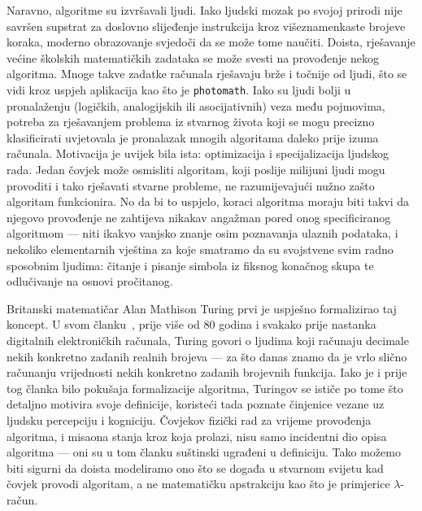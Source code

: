Naravno, algoritme su izvršavali ljudi. Iako ljudski mozak po svojoj prirodi nije savršen supstrat za doslovno slijeđenje instrukcija kroz višeznamenkaste brojeve koraka, moderno obrazovanje svjedoči da se može tome na\-u\-či\-ti. Doista, rješavanje većine školskih matematičkih zadataka se može svesti na provođenje nekog algoritma. Mnoge takve zadatke računala rješavaju brže i točnije od ljudi, što se vidi kroz uspjeh aplikacija kao što je \texttt{photomath}. Iako su ljudi bolji u pronalaženju (logičkih, analogijskih ili asocijativnih) veza među pojmovima, potreba za rješavanjem problema iz stvarnog života koji se mogu precizno klasificirati uvjetovala je pronalazak mnogih algoritama daleko prije izuma računala. Motivacija je uvijek bila ista: optimizacija i specijalizacija ljudskog rada. Jedan čovjek može osmisliti algoritam, koji poslije milijuni ljudi mogu provoditi i tako rješavati stvarne probleme, ne razumijevajući nužno zašto algoritam funkcionira. No da bi to uspjelo, koraci algoritma moraju biti takvi da njegovo provođenje ne zahtijeva nikakav angažman pored onog specificiranog algoritmom --- niti ikakvo vanjsko znanje osim poznavanja ulaznih podataka, i nekoliko elementarnih vještina za koje smatramo da su svojstvene svim radno sposobnim ljudima: čitanje i pisanje simbola iz fiksnog konačnog skupa te odlučivanje na osnovi pročitanog.

Britanski matematičar Alan Mathison Turing prvi je uspješno formalizirao taj koncept. U svom članku~\cite{turing}, prije više od 80 godina i svakako prije nastanka digitalnih elektroničkih računala, Turing govori o ljudima koji računaju decimale nekih konkretno zadanih realnih brojeva --- za što danas znamo da je vrlo slično računanju vrijednosti nekih konkretno zadanih brojevnih funkcija. Iako je i prije tog članka bilo pokušaja formalizacije algoritma, Turingov se ističe po tome što detaljno motivira svoje definicije, koristeći tada poznate činjenice vezane uz ljudsku percepciju i kogniciju. Čovjekov fizički rad za vrijeme provođenja algoritma, i misaona stanja kroz koja prolazi, nisu samo incidentni dio opisa algoritma --- oni su u tom članku suštinski ugrađeni u definiciju. Tako možemo biti sigurni da doista modeliramo ono što se događa u stvarnom svijetu kad čovjek provodi algoritam, a ne matematičku apstrakciju kao što je primjerice $\lambda$-račun.


